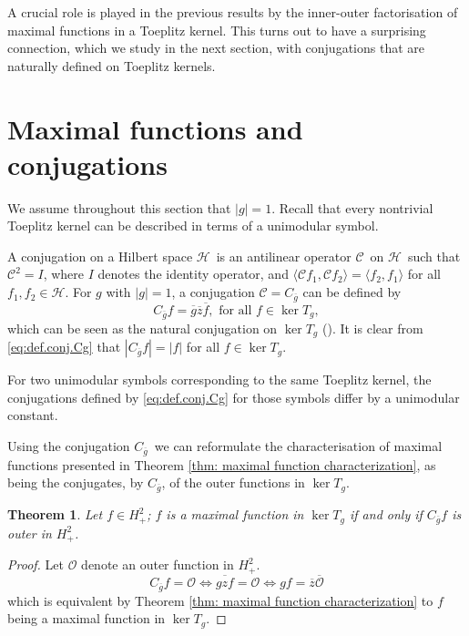 \documentclass[12pt]{elsarticle}
\numberwithin{equation}{section}
\theoremstyle{plain}
\newtheorem{thm}{Theorem}[section]
\newcommand{\Hp}{\ensuremath{H^2_+}}
\newcommand{\CCC}{\ensuremath{\mathcal{C}}}
\newcommand{\OO}{\ensuremath{\mathcal{O}}}
\newcommand{\HH}{\ensuremath{\mathcal{H}}}
\newcommand{\Cg}{\ensuremath{C_{\ol g}}}
\newcommand{\ol}[1]{\ensuremath{\overline{#1}}}
\begin{document}
A crucial role is played in the previous results by the inner-outer factorisation of maximal functions in a Toeplitz kernel.
This turns out to have a surprising connection, which we study in the next section, with conjugations that are naturally defined on Toeplitz kernels.







\section{Maximal functions and conjugations}
\label{sec: Maximal functions and conjugations}

We assume throughout this section that $|g|=1$.
Recall that every nontrivial Toeplitz kernel can be described in terms of a unimodular symbol.


A conjugation on a Hilbert space \HH\ is an antilinear operator \CCC\ on \HH\ such that $\CCC^2 = I$, where $I$ denotes the identity operator, and $\langle \CCC f_1 , \CCC f_2 \rangle = \langle f_2 , f_1 \rangle$ for all $f_1, f_2 \in \HH$.
For $g$ with $|g|=1$, a conjugation $\CCC = \Cg$ can be defined by
\begin{equation}
\label{eq:def.conj.Cg}
\Cg f = \ol g \ol z \ol f, \text{ for all } f \in \ker T_g,
\end{equation}
which can be seen as the natural conjugation on $\ker T_g$ (\cite{DyPlaPtak22}).
It is clear from \eqref{eq:def.conj.Cg} that $|\Cg f| = |f|$ for all $f \in \ker T_g$.


For two unimodular symbols corresponding to the same Toeplitz kernel, the conjugations defined by \eqref{eq:def.conj.Cg} for those symbols differ by a unimodular constant.


Using the conjugation \Cg\ we can reformulate the characterisation of maximal functions presented in Theorem \ref{thm: maximal function characterization}, as being the conjugates, by \Cg, of the outer functions in $\ker T_g$.


\begin{thm}
\label{thm:max_func_charact_with_conj}
Let $f\in\Hp$; $f$ is a maximal function in $\ker T_g$ if and only if $\Cg f$ is outer in \Hp.
\end{thm}


\begin{proof}
Let $\OO$ denote an outer function in \Hp.
\[
\Cg f = \OO \iff \ol{gzf} = \OO \iff gf = \ol z \ol\OO
\]
which is equivalent by Theorem \ref{thm: maximal function characterization} to $f$ being a maximal function in $\ker T_g$.
\end{proof}
\end{document}
